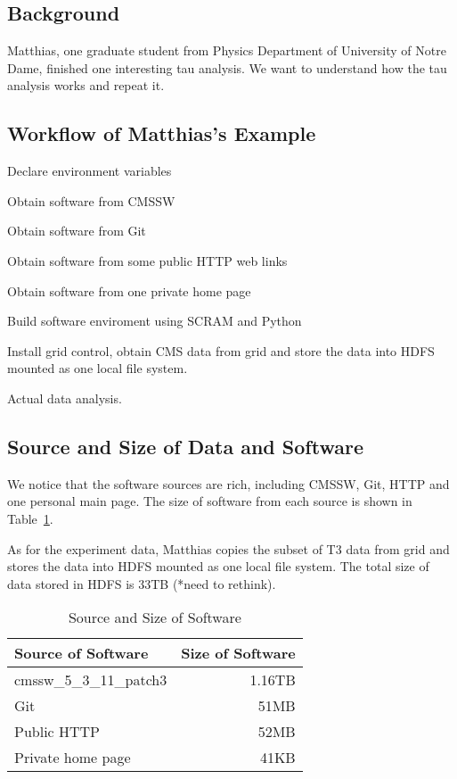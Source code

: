 \documentclass{acm_proc_article-sp}
\begin{document}
\subsection{Background}
Matthias, one graduate student from Physics Department of University of Notre Dame, finished one interesting tau analysis. We want to understand how the tau analysis works and repeat it. 

\subsection{Workflow of Matthias's Example}
Declare environment variables

Obtain software from CMSSW

Obtain software from Git

Obtain software from some public HTTP web links

Obtain software from one private home page

Build software enviroment using SCRAM and Python

Install grid control, obtain CMS data from grid and store the data into HDFS mounted as one local file system.

Actual data analysis.

\subsection{Source and Size of Data and Software}
We notice that the software sources are rich, including CMSSW, Git, HTTP and one personal main page. The size of software from each source is shown in Table~\ref{table:software-source-size}.

As for the experiment data, Matthias copies the subset of T3 data from grid and stores the data into HDFS mounted as one local file system. The total size of data stored in HDFS is 33TB (*need to rethink).

\begin{table}
    \centering
    \begin{tabular}{|l|r|}
        \hline
        Source of Software & Size of Software \\ \hline
        cmssw\_5\_3\_11\_patch3 & 1.16TB \\ \hline
        Git & 51MB \\ \hline
        Public HTTP & 52MB \\ \hline
        Private home page & 41KB \\ \hline
    \end{tabular}
    \caption{Source and Size of Software}
    \label{table:software-source-size}
\end{table}
\end{document}
